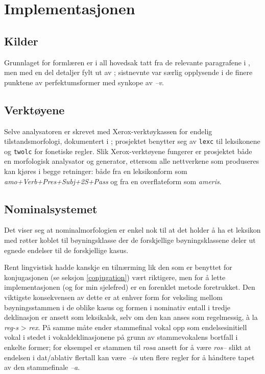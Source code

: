 \documentclass{article}
\begin{document}
\section{Implementasjonen}
\subsection{Kilder} %
Grunnlaget for forml\ae{}ren er i all hovedsak tatt fra de relevante
paragrafene i , men med en del detaljer fylt ut av
; sistnevnte var s\ae{}rlig opplysende i de finere punktene av
perfektumsformer med synkope av \emph{--v}.

\subsection{Verkt\o{}yene}
Selve analysatoren er skrevet med Xerox-verkt\o{}ykassen for endelig
tilstandsmorfologi, dokumentert i ; prosjektet benytter seg av
\texttt{lexc} til leksikonene og \texttt{twolc} for fonetiske regler. Slik
Xerox-verkt\o{}yene fungerer er prosjektet b\aa{}de en morfologisk analysator
og generator, ettersom alle nettverkene som produseres kan kj\o{}res i begge
retninger: b\aa{}de fra en leksikonform som \emph{amo+Verb+Pres+Subj+2S+Pass}
og fra en overflateform som \emph{ameris}.


\subsection{Nominalsystemet}
Det viser seg at nominalmorfologien er enkel nok til at det holder \aa{} ha et
leksikon med r\o{}tter koblet til b\o{}yningsklasse der de forskjellige
b\o{}yningsklassene deler ut egnede endelser til de forskjellige kasus.

Rent lingvistisk hadde kanskje en tiln\ae{}rming lik den som er benyttet for
konjugasjonen (se seksjon \ref{conjugation}) v\ae{}rt riktigere, men for \aa{}
lette implementasjonen (og for min sjelefred) er en forenklet metode
foretrukket. Den viktigste konsekvensen av dette er at enhver form for
veksling mellom b\o{}yningsstammen i de oblike kasus og formen i nominativ
entall i tredje deklinasjon er ansett som leksikalsk, selv om den kan anses
som regelmessig, \`a la \emph{reg-s} > \emph{rex}. P\aa{} samme m\aa{}te ender
stammefinal vokal opp som endelsesinitiell vokal i stedet i
vokaldeklinasjonene p\aa{} grunn av stammevokalens bortfall i enkelte former;
for eksempel er stammen til \emph{rosa} ansett for \aa{} v\ae{}re \emph{ros--}
slikt at endelsen i dat/ablativ flertall kan v\ae{}re \emph{--is} uten flere
regler for \aa{} h\aa{}ndtere tapet av den stammefinale \emph{--a}.
\end{document}
